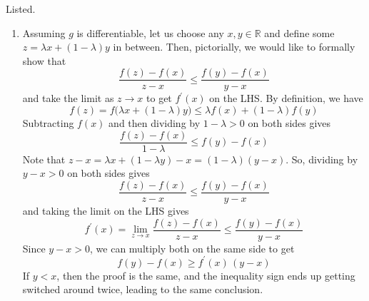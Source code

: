 \documentclass{article}
\begin{document}
  \begin{solution}
  Listed. 
  \begin{enumerate}
      \item Assuming $g$ is differentiable, let us choose any $x, y \in \mathbb{R}$ and define some $z = \lambda x + (1 - \lambda)y$ in between. Then, pictorially, we would like to formally show that 
      \[\frac{f(z) - f(x)}{z - x} \leq \frac{f(y) - f(x)}{y - x}\]
      and take the limit as $z \rightarrow x$ to get $f^\prime(x)$ on the LHS. By definition, we have 
      \[f(z) = f\big( \lambda x + (1 - \lambda) y\big) \leq \lambda f(x) + (1 - \lambda) f(y)\]
      Subtracting $f(x)$ and then dividing by $1 - \lambda > 0$ on both sides gives 
      \[\frac{f(z) - f(x)}{1 - \lambda} \leq f(y) - f(x)\] 
      Note that $z - x = \lambda x + (1 - \lambda y) - x = (1 - \lambda)(y - x)$. So, dividing by $y - x > 0$ on both sides gives 
      \[\frac{f(z) - f(x)}{z - x} \leq \frac{f(y) - f(x)}{y - x}\]
      and taking the limit on the LHS gives 
      \[f^\prime (x) = \lim_{z \rightarrow x} \frac{f(z) - f(x)}{z - x} \leq \frac{f(y) - f(x)}{y - x}\]
      Since $y - x > 0$, we can multiply both on the same side to get 
      \[f(y) - f(x) \geq f^\prime (x) \, (y - x)\]
      If $y < x$, then the proof is the same, and the inequality sign ends up getting switched around twice, leading to the same conclusion. 
      

\end{enumerate}
\end{solution}
\end{document}
